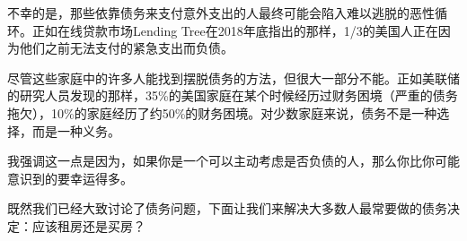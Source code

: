 不幸的是，那些依靠债务来支付意外支出的人最终可能会陷入难以逃脱的恶性循环。正如在线贷款市场Lending Tree在2018年底指出的那样，1/3的美国人正在因为他们之前无法支付的紧急支出而负债。

尽管这些家庭中的许多人能找到摆脱债务的方法，但很大一部分不能。正如美联储的研究人员发现的那样，35\%的美国家庭在某个时候经历过财务困境（严重的债务拖欠），10\%的家庭经历了约50\%的财务困境。对少数家庭来说，债务不是一种选择，而是一种义务。

我强调这一点是因为，如果你是一个可以主动考虑是否负债的人，那么你比你可能意识到的要幸运得多。

既然我们已经大致讨论了债务问题，下面让我们来解决大多数人最常要做的债务决定：应该租房还是买房？

